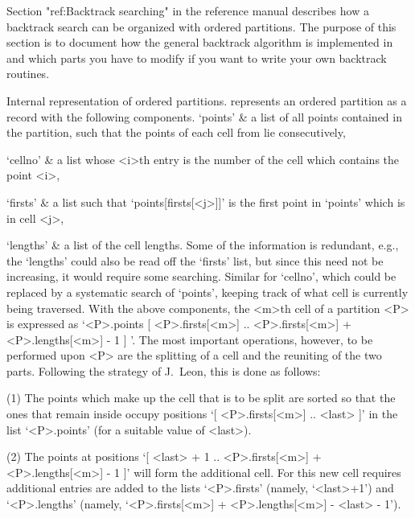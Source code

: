 
Section "ref:Backtrack searching" in the reference manual describes how a
backtrack search can be organized with ordered partitions. The purpose of
this section  is  to document  how  the general   backtrack algorithm  is
implemented in {\GAP} and which  parts you have to modify  if you want to
write your own backtrack routines.

\medskip%
%
{\bsf   Internal   representation  of  ordered  partitions.}\quad  {\GAP}
represents an   ordered   partition  as a  record    with   the following
components.
\beginitems
`points' &
        a list  of all points contained in  the  partition, such that the
        points of each cell from lie consecutively,

`cellno' &
        a list whose <i>th entry is the number of the cell which contains
        the point <i>,

`firsts' &
        a list  such that  `points[firsts[<j>]]'  is  the first point  in
        `points' which is in cell <j>,

`lengths' &
        a list of the  cell lengths.
\enditems
Some of the information is  redundant, e.g., the  `lengths' could also be
read off the `firsts' list,  but since this   need not be increasing,  it
would    require some searching. Similar  for    `cellno', which could be
replaced by a systematic search  of `points', keeping  track of what cell
is currently being  traversed. With the above  components, the <m>th cell
of   a partition <P> is   expressed as `<P>.points{  [ <P>.firsts[<m>] ..
<P>.firsts[<m>] +  <P>.lengths[<m>]  -  1  ]   }'. The   most   important
operations, however, to be performed upon <P> are the splitting of a cell
and the reuniting  of the two parts. Following  the strategy  of J.~Leon,
this is done as follows:

(1) The points which make up the cell that  is to be  split are sorted so
that the ones  that remain inside occupy  positions `[ <P>.firsts[<m>] ..
<last> ]' in the list `<P>.points' (for a suitable value of <last>).

(2) The  points   at positions  `[   <last>  + 1 ..    <P>.firsts[<m>]  +
<P>.lengths[<m>] - 1 ]' will form the  additional cell. For this new cell
requires additional entries are  added to the lists `<P>.firsts' (namely,
`<last>+1')     and    `<P>.lengths'   (namely,      `<P>.firsts[<m>]   +
<P>.lengths[<m>] - <last> - 1').

